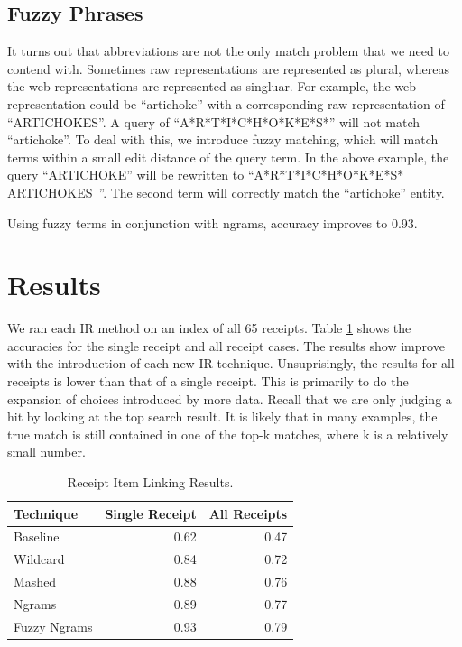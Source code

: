 \documentclass[11pt,a4paper]{article}
\begin{document}
\subsection{Fuzzy Phrases}
It turns out that abbreviations are not the only match problem that we
need to contend with.  Sometimes raw representations are represented
as plural, whereas the web representations are represented as
singluar.  For example, the web representation could be ``artichoke''
with a corresponding raw representation of ``ARTICHOKES''.  A query
of ``A*R*T*I*C*H*O*K*E*S*'' will not match ``artichoke''.  To deal
with this, we introduce fuzzy matching, which will match terms within
a small edit distance of the query term.  In the above example, the
query ``ARTICHOKE'' will be rewritten to ``A*R*T*I*C*H*O*K*E*S*
ARTICHOKES~''.  The second term will correctly match the ``artichoke''
entity.

Using fuzzy terms in conjunction with ngrams, accuracy improves to
0.93. 

\section{Results}

We ran each IR method on an index of all 65 receipts.
Table \ref{table:results} shows the accuracies for the single receipt and
all receipt cases.  The results show improve with the introduction of
each new IR technique.  Unsuprisingly, the results for all receipts is
lower than that of a single receipt.  This is primarily to do the
expansion of choices introduced by more data.  Recall that we are
only judging a hit by looking at the top search result.  It is likely
that in many examples, the true match is still contained in one of the
top-k matches, where k is a relatively small number.

\begin{table}[t!]
\begin{center}
\begin{tabular}{|l|r|r|}
\hline \textbf{Technique} & \textbf{Single Receipt} & \textbf{All Receipts} \\ \hline
Baseline & 0.62 & 0.47 \\
Wildcard & 0.84 & 0.72 \\
Mashed & 0.88 & 0.76 \\
Ngrams & 0.89 & 0.77 \\
Fuzzy Ngrams & 0.93 & 0.79 \\
\hline
\end{tabular}
\end{center}
\caption{\label{table:results} Receipt Item Linking Results. }
\end{table}
\end{document}
